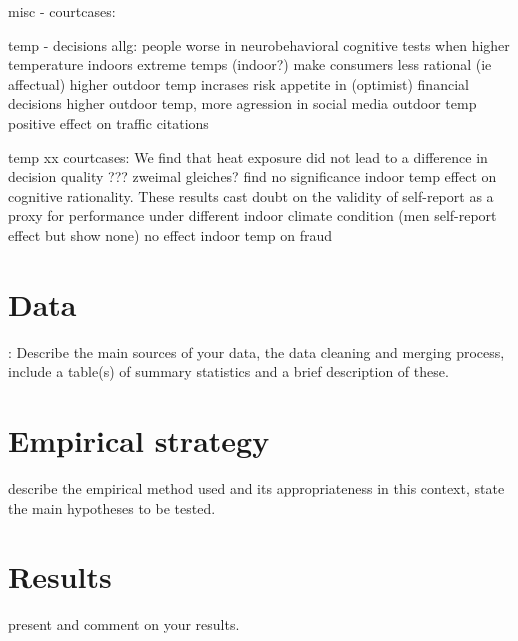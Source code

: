 \documentclass[11pt]{article}
\begin{document}
	misc - courtcases:
	
	temp - decisions allg: 
	\cite{Chen.2020} people worse in neurobehavioral cognitive tests when higher temperature indoors
	\cite{Hadi.2019} extreme temps (indoor?) make consumers less rational (ie affectual) 
	\cite{Gavresi.2021} higher outdoor temp incrases risk appetite in (optimist) financial decisions 
	\cite{Stevens.2021} higher outdoor temp, more agression in social media 
	\cite{Ryan.2020} outdoor temp positive effect on traffic citations
	
	temp xx courtcases:
	\cite{Stroom.2021} We find that heat exposure did not lead to  a difference in decision quality ??? zweimal gleiches?
	\cite{Stroom.2021} find no significance indoor temp effect on cognitive rationality.  These results cast doubt on the validity of self-report as a proxy for performance under different indoor climate condition (men self-report effect but show none) 
	\cite{Liu.2020} no effect indoor temp on fraud 
	
	
	
	
	
	
	\section{Data}
	: Describe the main sources of your data, the data cleaning and merging process,
	include a table(s) of summary statistics and a brief description of these.
	\section{Empirical strategy}
	describe the empirical method used and its appropriateness in this
	context, state the main hypotheses to be tested.
	\section{Results}
	present and comment on your results.
	
\end{document}
